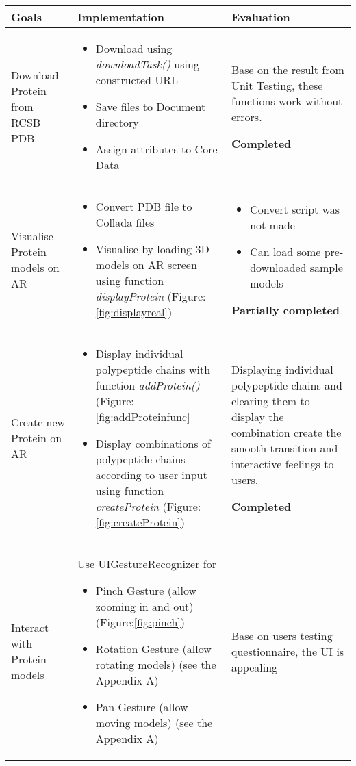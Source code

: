 \begin{table}[!h]
\centering
\begin{tabular}{| m{} | m{} | m{}|}
\hline
Goals & Implementation & Evaluation\\
\hline
Download Protein from RCSB PDB & 
\begin{itemize}
	\item Download using \emph{downloadTask()} using constructed URL
	\item Save files to Document directory
	\item Assign attributes to Core Data
\end{itemize} &
Base on the result from Unit Testing, these functions work without errors.

\textbf{Completed}\\
\hline

Visualise Protein models on AR & 
\begin{itemize}
	\item Convert PDB file to Collada files
	\item Visualise by loading 3D models on AR screen using function \emph{displayProtein} (Figure: \ref{fig:displayreal})
\end{itemize} &
\begin{itemize}
	\item Convert script was not made
	\item Can load some pre-downloaded sample models
\end{itemize}	

\textbf{Partially completed} \\
\hline

Create new Protein on AR & 
\begin{itemize}
	\item Display individual polypeptide chains with function \emph{addProtein()} (Figure: \ref{fig:addProteinfunc}
	\item Display combinations of polypeptide chains according to user input using function \emph{createProtein} (Figure: \ref{fig:createProtein}) 
\end{itemize} &
Displaying individual polypeptide chains and clearing them to display the combination create the smooth transition and interactive feelings to users.

\textbf{Completed}\\
\hline

Interact with Protein models &
 Use UIGestureRecognizer for 
 \begin{itemize} 
	 \item Pinch Gesture (allow zooming in and out) (Figure:\ref{fig:pinch})
	 \item Rotation Gesture (allow rotating models) (see the Appendix A)
	 \item Pan Gesture (allow moving models) (see the Appendix A)
\end{itemize} &
Base on users testing questionnaire, the UI is appealing 


\end{tabular}
\end{table}
